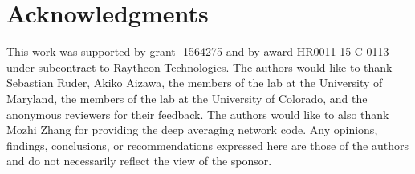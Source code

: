 \section*{Acknowledgments}
This work was supported by  grant -1564275
and by  award HR0011-15-C-0113 under subcontract to Raytheon  Technologies.
The authors would like to thank Sebastian Ruder, Akiko Aizawa,
the members of the  lab at the University of Maryland,
the members of the  lab at the University of Colorado,
and the anonymous reviewers for their feedback.
The authors would like to also thank Mozhi Zhang for
providing the deep averaging network code.
Any opinions, findings, conclusions, or recommendations expressed here
are those of the authors and do not necessarily reflect the view of
the sponsor.

